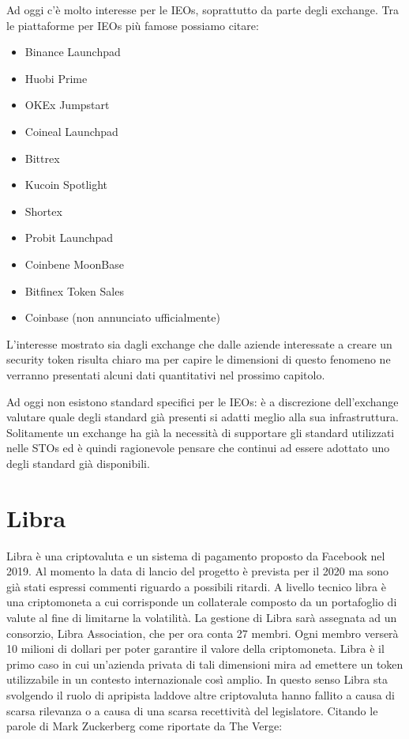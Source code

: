 Ad oggi c'è molto interesse per le IEOs, soprattutto da parte degli exchange. Tra le piattaforme per IEOs più famose possiamo citare:
\begin{itemize}
    \item Binance Launchpad
    \item Huobi Prime
    \item OKEx Jumpstart
    \item Coineal Launchpad 
    \item Bittrex
    \item Kucoin Spotlight
    \item Shortex 
    \item Probit Launchpad 
    \item Coinbene MoonBase
    \item Bitfinex Token Sales
    \item Coinbase (non annunciato ufficialmente) 
\end{itemize}
L'interesse mostrato sia dagli exchange che dalle aziende interessate a creare un security token risulta chiaro ma per capire le dimensioni di questo fenomeno ne verranno presentati alcuni dati quantitativi nel prossimo capitolo.

Ad oggi non esistono standard specifici per le IEOs: è a discrezione dell'exchange valutare quale degli standard già presenti si adatti meglio alla sua infrastruttura. Solitamente un exchange ha già la necessità di supportare gli standard utilizzati nelle STOs ed è quindi ragionevole pensare che continui ad essere adottato uno degli standard già disponibili. 

\section{Libra}
Libra è una criptovaluta e un sistema di pagamento proposto da Facebook nel 2019. Al momento la data di lancio del progetto è prevista per il 2020 ma sono già stati espressi commenti riguardo a possibili ritardi. 
A livello tecnico libra è una criptomoneta a cui corrisponde un collaterale composto da un portafoglio di valute al fine di limitarne la volatilità. La gestione di Libra sarà assegnata ad un consorzio, Libra Association, che per ora conta 27 membri. Ogni membro verserà 10 milioni di dollari per poter garantire il valore della criptomoneta. 
Libra è il primo caso in cui un'azienda privata di tali dimensioni mira ad emettere un token utilizzabile in un contesto internazionale così amplio. In questo senso Libra sta svolgendo il ruolo di apripista laddove altre criptovaluta hanno fallito a causa di scarsa rilevanza o a causa di una scarsa recettività del legislatore. Citando le parole di Mark Zuckerberg come riportate da The Verge: 

